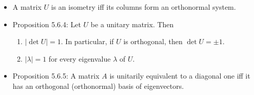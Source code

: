 \documentclass[../../notes.tex]{subfiles}
\begin{document}
\begin{itemize}
\begin{enumerate}
    \end{enumerate}
    \item A matrix $U$ is an isometry iff its columns form an orthonormal system.
    \item Proposition 5.6.4: Let $U$ be a unitary matrix. Then
    \begin{enumerate}
        \item $|\det U|=1$. In particular, if $U$ is orthogonal, then $\det U=\pm 1$.
        \item $|\lambda|=1$ for every eigenvalue $\lambda$ of $U$.
    \end{enumerate}
    \item Proposition 5.6.5: A matrix $A$ is unitarily equivalent to a diagonal one iff it has an orthogonal (orthonormal) basis of eigenvectors.
\end{itemize}
\end{document}
